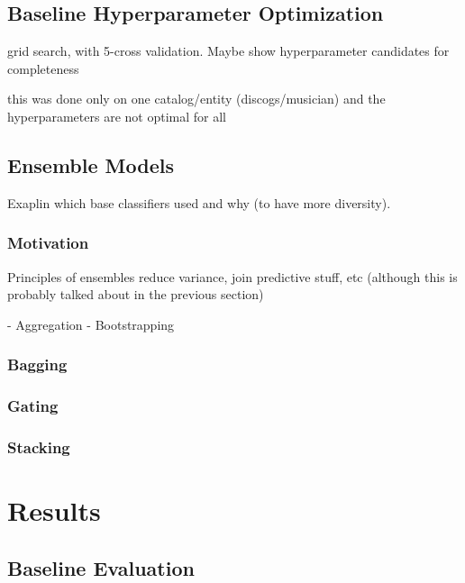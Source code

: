 \documentclass[epsfig,a4paper,11pt,titlepage,twoside,openany]{book}
\begin{document}
\section{Baseline Hyperparameter Optimization}
\label{sec:hyperpar-optimization}

grid search, with 5-cross validation. Maybe show hyperparameter candidates for
completeness

this was done only on one catalog/entity (discogs/musician) and the
hyperparameters are not optimal for all



\section{Ensemble Models}
\label{chap:ensemble-models}

Exaplin which base classifiers used and why (to have more diversity).

\subsection{Motivation} 
\label{sec:motivation-ensemble}

Principles of ensembles reduce variance, join predictive stuff, etc (although
this is probably talked about in the previous section)

- Aggregation - Bootstrapping
     
\subsection{Bagging}
\label{sec:ens-bagging}

\subsection{Gating}
\label{sec:ens-gating}

\subsection{Stacking}
\label{sec:ens-stacking}



\chapter{Results}
\label{chap:results}

\section{Baseline Evaluation}
\label{sec:baseline-evaluation}
\end{document}
